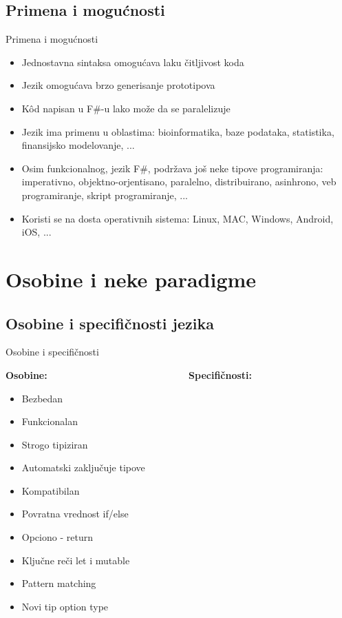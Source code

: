 \documentclass{beamer}
\begin{document}
\subsection*{Primena i mogućnosti}
\begin{frame}{Primena i mogućnosti}

\begin{itemize}
\item Jednostavna sintaksa omogućava laku čitljivost koda
\item Jezik omogućava brzo generisanje prototipova
\item Kôd napisan u F\#-u lako može da se paralelizuje
\item Jezik ima primenu u oblastima: bioinformatika, baze podataka, statistika, finansijsko modelovanje, ...
\item Osim funkcionalnog, jezik F\#, podržava još neke tipove programiranja: imperativno, objektno-orjentisano, paralelno, distribuirano, asinhrono, veb programiranje, skript programiranje, ...
\item Koristi se na dosta operativnih sistema: Linux, MAC, Windows, Android, iOS, ...
\end{itemize}

\end{frame}

\section{Osobine i neke paradigme}
\subsection*{Osobine i specifičnosti jezika}
\begin{frame}{Osobine i specifičnosti}
\begin{center}

\textbf{Osobine:} ~~~~~~~~~~~~~~~~~~~~~~~~~~~~ \textbf{Specifičnosti:}
\end{center}
\begin{multicols}{2}
\begin{itemize}
  \item Bezbedan
  \item Funkcionalan
  \item Strogo tipiziran
  \item Automatski zaključuje tipove
  \item Kompatibilan
  \item Povratna vrednost if/else
  \item Opciono - return
  \item Ključne reči let i mutable
  \item Pattern matching
  \item Novi tip option type
\end{itemize}
\end{multicols}

\end{frame}
\end{document}
